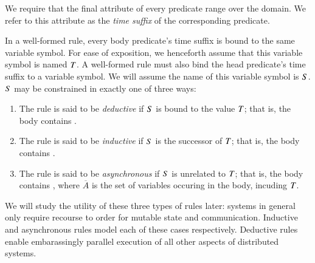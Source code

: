 We require that the final attribute of every \lang predicate range over the  domain.  
We refer to this attribute as the \emph{time suffix} of the corresponding predicate.

%
%
In a well-formed \lang rule, every body predicate's time suffix is bound to the
same variable symbol.  For ease of exposition, we henceforth assume that this
variable symbol is named $\DT$.  A well-formed \lang rule must also bind the head
predicate's time suffix to a variable symbol.  We will assume the name of this
variable symbol is $\DS$.  $\DS$ may be constrained in exactly one of three ways:

\begin{enumerate}
%
\item The rule is said to be {\em deductive} if $\DS$ is bound to the
value $\DT$; that is, the body contains \dedalus{$\DS$ = $\DT$}.
%
\item The rule is said to be {\em inductive} if $\DS$ is the successor of
$\DT$; that is, the body contains .
%
\item The rule is said to be {\em asynchronous} if $\DS$ is unrelated to $\DT$;
that is, the body contains , where $\overline{A}$ is the set of variables occuring in the body, incuding $\DT$.
\end{enumerate}

We will study the utility of these three types of rules later: systems in general only require recourse to order for mutable state and communication.  Inductive and asynchronous rules model each of these cases respectively.  Deductive rules enable embarassingly parallel execution of all other aspects of distributed systems. 

